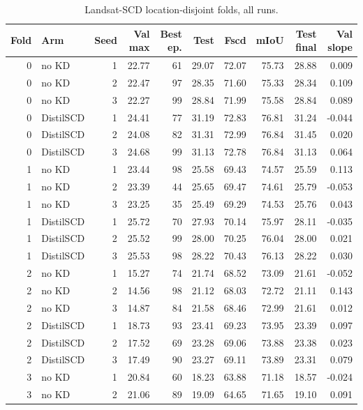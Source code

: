 \begin{table}[!t]
\centering
\footnotesize
\caption{Landsat-SCD location-disjoint folds, all runs.}
\label{tab:s-landsat-runs}
\begin{tabular}{rlrrrrrrrr}
\toprule
Fold & Arm & Seed & Val max & Best ep. & Test & Fscd & mIoU & Test final & Val slope \\
\midrule
0 & no KD & 1 & 22.77 & 61 & 29.07 & 72.07 & 75.73 & 28.88 & 0.009 \\
0 & no KD & 2 & 22.47 & 97 & 28.35 & 71.60 & 75.33 & 28.34 & 0.109 \\
0 & no KD & 3 & 22.27 & 99 & 28.84 & 71.99 & 75.58 & 28.84 & 0.089 \\
0 & DistilSCD & 1 & 24.41 & 77 & 31.19 & 72.83 & 76.81 & 31.24 & -0.044 \\
0 & DistilSCD & 2 & 24.08 & 82 & 31.31 & 72.99 & 76.84 & 31.45 & 0.020 \\
0 & DistilSCD & 3 & 24.68 & 99 & 31.13 & 72.78 & 76.84 & 31.13 & 0.064 \\
1 & no KD & 1 & 23.44 & 98 & 25.58 & 69.43 & 74.57 & 25.59 & 0.113 \\
1 & no KD & 2 & 23.39 & 44 & 25.65 & 69.47 & 74.61 & 25.79 & -0.053 \\
1 & no KD & 3 & 23.25 & 35 & 25.49 & 69.29 & 74.53 & 25.76 & 0.043 \\
1 & DistilSCD & 1 & 25.72 & 70 & 27.93 & 70.14 & 75.97 & 28.11 & -0.035 \\
1 & DistilSCD & 2 & 25.52 & 99 & 28.00 & 70.25 & 76.04 & 28.00 & 0.021 \\
1 & DistilSCD & 3 & 25.53 & 98 & 28.22 & 70.43 & 76.13 & 28.22 & 0.030 \\
2 & no KD & 1 & 15.27 & 74 & 21.74 & 68.52 & 73.09 & 21.61 & -0.052 \\
2 & no KD & 2 & 14.56 & 98 & 21.12 & 68.03 & 72.72 & 21.11 & 0.143 \\
2 & no KD & 3 & 14.87 & 84 & 21.58 & 68.46 & 72.99 & 21.61 & 0.012 \\
2 & DistilSCD & 1 & 18.73 & 93 & 23.41 & 69.23 & 73.95 & 23.39 & 0.097 \\
2 & DistilSCD & 2 & 17.52 & 69 & 23.28 & 69.06 & 73.88 & 23.38 & 0.023 \\
2 & DistilSCD & 3 & 17.49 & 90 & 23.27 & 69.11 & 73.89 & 23.31 & 0.079 \\
3 & no KD & 1 & 20.84 & 60 & 18.23 & 63.88 & 71.18 & 18.57 & -0.024 \\
3 & no KD & 2 & 21.06 & 89 & 19.09 & 64.65 & 71.65 & 19.10 & 0.091 \\

\end{tabular}
\end{table}
